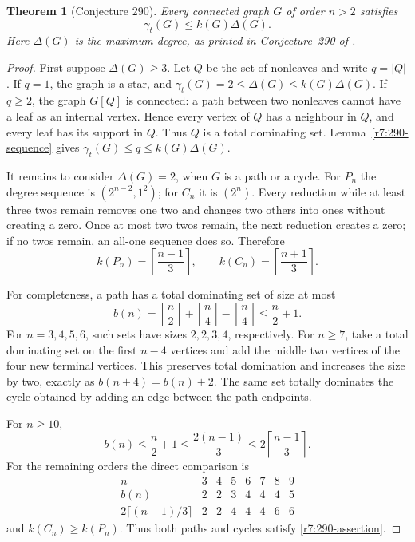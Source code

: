 \documentclass[11pt,a4paper]{article}
\newtheorem{theorem}{Theorem}[section]
\theoremstyle{remark}
\begin{document}
\begin{theorem}[Conjecture 290]
\label{r7:290-theorem}
Every connected graph $G$ of order $n>2$ satisfies
\begin{equation}
 \gamma_t(G)\le k(G)\Delta(G).
 \label{r7:290-assertion}
\end{equation}
Here $\Delta(G)$ is the maximum degree, as printed in
Conjecture~290 of \cite{WOWII}.
\end{theorem}

\begin{proof}
First suppose $\Delta(G)\ge3$.  Let $Q$ be the set of nonleaves and
write $q=|Q|$.  If $q=1$, the graph is a star, and
$\gamma_t(G)=2\le\Delta(G)\le k(G)\Delta(G)$.
If $q\ge2$, the graph $G[Q]$ is connected: a path between two
nonleaves cannot have a leaf as an internal vertex.  Hence every
vertex of $Q$ has a neighbour in $Q$, and every leaf has its support
in $Q$.  Thus $Q$ is a total dominating set.  Lemma~\ref{r7:290-sequence}
gives $\gamma_t(G)\le q\le k(G)\Delta(G)$.

It remains to consider $\Delta(G)=2$, when $G$ is a path or a cycle.
For $P_n$ the degree sequence is $(2^{n-2},1^2)$; for $C_n$ it is
$(2^n)$.  Every reduction while at least three twos remain removes
one two and changes two others into ones without creating a zero.
Once at most two twos remain, the next reduction creates a zero;
if no twos remain, an all-one sequence does so.  Therefore
\[
 k(P_n)=\left\lceil\frac{n-1}{3}\right\rceil,
 \qquad
 k(C_n)=\left\lceil\frac{n+1}{3}\right\rceil.
\]

For completeness, a path has a total dominating set of size at most
\[
 b(n)=\left\lfloor\frac n2\right\rfloor+
       \left\lceil\frac n4\right\rceil-
       \left\lfloor\frac n4\right\rfloor
       \le\frac n2+1.
\]
For $n=3,4,5,6$, such sets have sizes $2,2,3,4$, respectively.
For $n\ge7$, take a total dominating set on the first $n-4$
vertices and add the middle two vertices of the four new terminal
vertices.  This preserves total domination and increases the size
by two, exactly as $b(n+4)=b(n)+2$.  The same set totally dominates
the cycle obtained by adding an edge between the path endpoints.

For $n\ge10$,
\[
 b(n)\le\frac n2+1\le\frac{2(n-1)}3
       \le2\left\lceil\frac{n-1}{3}\right\rceil.
\]
For the remaining orders the direct comparison is
\[
\begin{array}{c|rrrrrrr}
 n&3&4&5&6&7&8&9\\ \hline
 b(n)&2&2&3&4&4&4&5\\
 2\lceil(n-1)/3\rceil&2&2&4&4&4&6&6
\end{array}
\]
and $k(C_n)\ge k(P_n)$.  Thus both paths and cycles satisfy
\eqref{r7:290-assertion}.
\end{proof}
\end{document}
